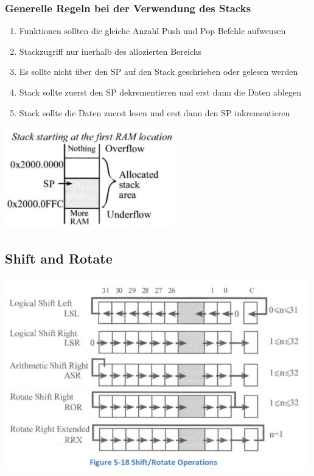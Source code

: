 \subsubsection{Generelle Regeln bei der Verwendung des Stacks}
\begin{multicols}{2}
    \begin{enumerate}
        \item Funktionen sollten die gleiche Anzahl Push und Pop Befehle aufweusen
        \item Stackzugriff nur inerhalb des allozierten Bereichs
        \item Es sollte nicht über den SP auf den Stack geschrieben oder gelesen werden
        \item Stack sollte zuerst den SP dekrementieren und erst dann die Daten ablegen
        \item Stack sollte die Daten zuerst lesen und erst dann den SP inkrementieren
    \end{enumerate}
    \includegraphics[width=0.8\linewidth]{images/allocatedStack}  
\end{multicols}

\subsection{Shift and Rotate}
\includegraphics[width=0.8\linewidth]{images/shiftandrotate} 